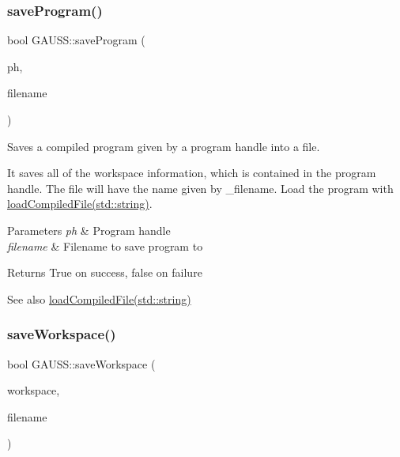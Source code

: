 \subsubsection{\texorpdfstring{save\+Program()}{saveProgram()}}
{\footnotesize\ttfamily bool G\+A\+U\+S\+S\+::save\+Program (\begin{DoxyParamCaption}\item[{Program\+Handle\+\_\+t $\ast$}]{ph,  }\item[{std\+::string}]{filename }\end{DoxyParamCaption})}



Saves a compiled program given by a program handle into a file. 

It saves all of the workspace information, which is contained in the program handle. The file will have the name given by \+\_\+filename. Load the program with \hyperlink{class_g_a_u_s_s_a664d80b6f169ea22867b4a949d2fbc93}{load\+Compiled\+File(std\+::string)}.


\begin{DoxyParams}{Parameters}
{\em ph} & Program handle \\
\hline
{\em filename} & Filename to save program to \\
\hline
\end{DoxyParams}
\begin{DoxyReturn}{Returns}
True on success, false on failure
\end{DoxyReturn}
\begin{DoxySeeAlso}{See also}
\hyperlink{class_g_a_u_s_s_a664d80b6f169ea22867b4a949d2fbc93}{load\+Compiled\+File(std\+::string)} 
\end{DoxySeeAlso}
\mbox{\label{class_g_a_u_s_s_a7bca1d6810ef2a67a53bacc1ddb9a8c0}} 
\subsubsection{\texorpdfstring{save\+Workspace()}{saveWorkspace()}}
{\footnotesize\ttfamily bool G\+A\+U\+S\+S\+::save\+Workspace (\begin{DoxyParamCaption}\item[{\hyperlink{class_g_e_workspace}{G\+E\+Workspace} $\ast$}]{workspace,  }\item[{std\+::string}]{filename }\end{DoxyParamCaption})}




